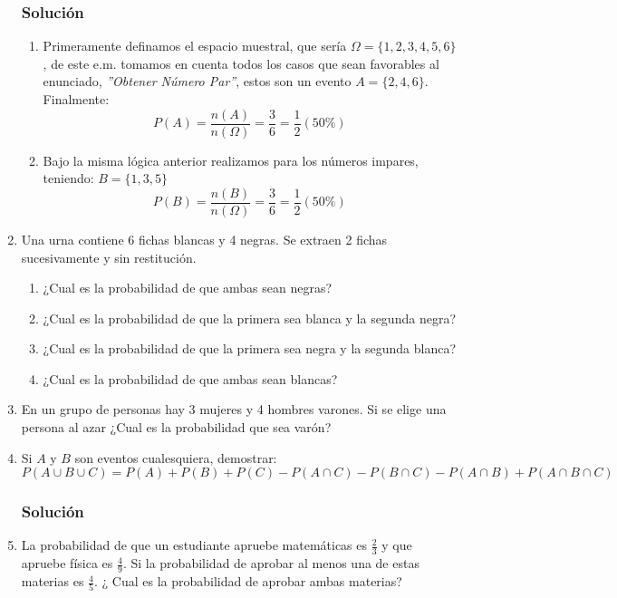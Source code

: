 \begin{enumerate}
\subsubsection{Solución}
\begin{enumerate}
\item Primeramente definamos el espacio muestral, que sería $\Omega = \lbrace 1,2,3,4,5,6 \rbrace$, de este e.m. tomamos en cuenta todos los casos que sean favorables al enunciado, \textit{''Obtener Número Par''}, estos son un evento $A=\lbrace 2,4,6\rbrace$. Finalmente:
$$P(A)=\dfrac{n(A)}{n(\Omega)}=\dfrac{3}{6}=\dfrac{1}{2} (50\%)$$
\item Bajo la misma lógica anterior realizamos para los números impares, teniendo: $B=\lbrace 1,3,5\rbrace$
$$P(B)=\dfrac{n(B)}{n(\Omega)}=\dfrac{3}{6}=\dfrac{1}{2} (50\%)$$
\end{enumerate}
\item Una urna contiene 6 fichas blancas y 4 negras. Se extraen 2 fichas sucesivamente y sin restitución.
\begin{enumerate}
\item ¿Cual es la probabilidad de que ambas sean negras?
\item ¿Cual es la probabilidad de que la primera sea blanca y la segunda negra?
\item ¿Cual es la probabilidad de que la primera sea negra y la segunda blanca?
\item ¿Cual es la probabilidad de que ambas sean blancas?
\end{enumerate}
\item En un grupo de personas hay 3 mujeres y 4 hombres varones. Si se elige una persona al azar ¿Cual es la probabilidad que sea varón?
\item Si $A$ y  $B$ son eventos cualesquiera, demostrar:
$$P(A\cup B\cup C)=P(A)+P(B)+P(C)-P(A\cap C)-P(B\cap C)-P(A\cap B)+P(A\cap B \cap C)$$
\subsubsection{Solución}
\item La probabilidad de que un estudiante apruebe matemáticas es $\frac{2}{3}$ y que apruebe física es $\frac{4}{9}$. Si la probabilidad de aprobar al menos una de estas materias es $\frac{4}{5}$. ¿ Cual es la probabilidad de aprobar ambas materias?

\end{enumerate}
